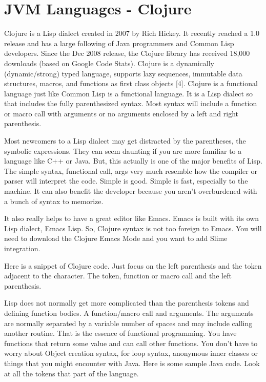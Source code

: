 \section{JVM Languages - Clojure}


Clojure is a Lisp dialect created in 2007 by Rich Hickey. It recently reached
a 1.0 release and has a large following of Java programmers and Common Lisp
developers. Since the Dec 2008 release, the Clojure library has received
18,000 downloads (based on Google Code Stats). Clojure is a dynamically
(dynamic/strong) typed language, supports lazy sequences, immutable data
structures, macros, and functions as first class objects [4]. Clojure is a
functional language just like Common Lisp is a functional language. It is a
Lisp dialect so that includes the fully parenthesized syntax. Most syntax
will include a function or macro call with arguments or no arguments enclosed
by a left and right parenthesis.

Most newcomers to a Lisp dialect may get distracted by the parentheses, the symbolic expressions. They can seem daunting if you are more familiar to a language like C++ or Java. But, this actually is one of the major benefits of Lisp. The simple syntax, functional call, args very much resemble how the compiler or parser will interpret the code. Simple is good. Simple is fast, especially to the machine. It can also benefit the developer because you aren't overburdened with a bunch of syntax to memorize.

It also really helps to have a great editor like Emacs. Emacs is built with its own Lisp dialect, Emacs Lisp. So, Clojure syntax is not too foreign to Emacs. You will need to download the Clojure Emacs Mode and you want to add Slime integration.

Here is a snippet of Clojure code. Just focus on the left parenthesis and the token adjacent to the character. The token, function or macro call and the left parenthesis.

Lisp does not normally get more complicated than the parenthesis tokens and
defining function bodies. A function/macro call and arguments. The arguments are normally separated by a variable number of spaces and may include calling another routine. That is the essence of functional programming. You have functions that return some value and can call other functions. You don't have to worry about Object creation syntax, for loop syntax, anonymous inner classes or things that you might encounter with Java. Here is some sample Java code. Look at all the tokens that part of the language.
